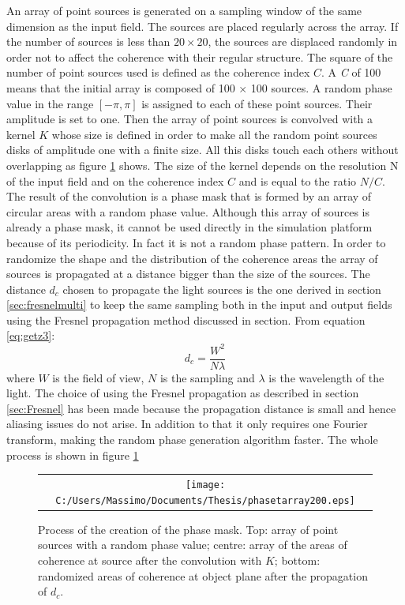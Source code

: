 An array of point sources is generated on a sampling window of the same dimension as the input field. The sources are placed regularly across the array. If the number of sources is less than $20 \times 20$, the sources are displaced randomly in order not to affect the coherence with their regular structure. The square of the number of point sources used is defined as the coherence index $C$. A \textit{C} of 100 means that the initial array is composed of 100 $\times$ 100 sources. A random phase value in the range $[-\pi,\pi]$ is assigned to each of these point sources. Their amplitude is set to one. Then the array of point sources is convolved with a kernel $K$ whose size is defined in order to make all the random point sources disks of amplitude one with a finite size. All this disks touch each others without overlapping as figure \ref{fig:phasemask2} shows. The size of the kernel depends on the resolution N of the input field and on the coherence index $C$ and is equal to the ratio $N/C$.\\
The result of the convolution is a phase mask that is formed by an array of circular areas with a random phase value.
Although this array of sources is already a phase mask, it cannot be used directly in the simulation platform because of its periodicity. In fact it is not a random phase pattern. In order to randomize the shape and the distribution of the coherence areas the array of sources is propagated at a distance bigger than the size of the sources. The distance $d_c$ chosen to propagate the light sources is the one derived in section \ref{sec:fresnelmulti} to keep the same sampling both in the input and output fields using the Fresnel propagation method discussed in section. From equation \ref{eq:getz3}:
\begin{equation}
\label{eq:propcoherence}
	d_c = \dfrac{W^2}{N\lambda}
\end{equation} 
where $W$ is the field of view, $N$ is the sampling and $\lambda$ is the wavelength of the light. The choice of using the Fresnel propagation as described in section \ref{sec:Fresnel} has been made because the propagation distance is small and hence aliasing issues do not arise. In addition to that it only requires one Fourier transform, making the random phase generation algorithm faster.
The whole process is shown in figure \ref{fig:phasemask2}
\newpage
\begin{figure}[H]
	\begin{center}
		\begin{tabular}{c}
			\texttt{[image: C:/Users/Massimo/Documents/Thesis/phasetarray200.eps]}
		\end{tabular}
	\end{center}
	\caption	{ \label{fig:phasemask2} 
		Process of the creation of the phase mask. Top: array of point sources with a random phase value; centre: array of the areas of coherence at source after the convolution with $K$; bottom: randomized areas of coherence at object plane after the propagation of $d_c$. }
\end{figure} 
